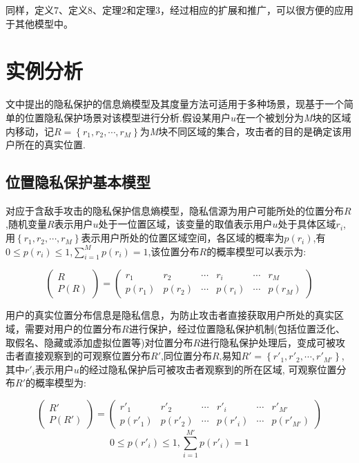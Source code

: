 同样，定义7、定义8、定理2和定理3，经过相应的扩展和推广，可以很方便的应用于其他模型中。

\section{实例分析}\label{instance analysis}
文中提出的隐私保护的信息熵模型及其度量方法可适用于多种场景，现基于一个简单的位置隐私保护场景对该模型进行分析.假设某用户$u$在一个被划分为\textit{M}块的区域内移动，记$R=\left \{ r_{1},r_{2},\cdots ,r_{M} \right \}$为\textit{M}块不同区域的集合，攻击者的目的是确定该用户所在的真实位置.
\subsection{位置隐私保护基本模型}
对应于含敌手攻击的隐私保护信息熵模型，隐私信源为用户可能所处的位置分布$R$,随机变量$R$表示用户$u$处于一位置区域，该变量的取值表示用户$u$处于具体区域$r_{i}$,用$\left \{ r_{1},r_{2},\cdots ,r_{M} \right \}$表示用户所处的位置区域空间，各区域的概率为$p(r_{i})$,有$0\leqslant p(r_{i})\leqslant 1$,$\sum_{i=1}^{M}p(r_{i})=1$,该位置分布$R$的概率模型可以表示为:

\begin{equation*}
\begin{pmatrix}
R\\ 
P(R)
\end{pmatrix}=\begin{pmatrix}
r_{1} & r_{2} & \cdots  & r_{i} & \cdots  & r_{M}\\ 
p(r_{1})& p(r_{2}) & \cdots & p(r_{i}) & \cdots & p(r_{M})
\end{pmatrix}
\end{equation*}

用户的真实位置分布信息是隐私信息，为防止攻击者直接获取用户所处的真实区域，需要对用户的位置分布$R$进行保护，经过位置隐私保护机制(包括位置泛化、取假名、隐藏或添加虚拟位置等)对位置分布$R$进行隐私保护处理后，变成可被攻击者直接观察到的可观察位置分布${R}'$,同位置分布$R$,易知${R}'=\left \{ {r}'_{1},{r}'_{2},\cdots ,{r}'_{{M}'} \right \}$,其中${r}'_{i}$表示用户$u$的经过隐私保护后可被攻击者观察到的所在区域, 可观察位置分布${R}'$的概率模型为:

\begin{equation*}
\begin{pmatrix}
R{}'\\ 
P({R}')
\end{pmatrix}=\begin{pmatrix}
{r}'_{1} & {r}'_{2} & \cdots  & {r}'_{i} & \cdots  & {r}'_{{M}'}\\ 
p({r}'_{1})& p({r}'_{2}) & \cdots & p({r}'_{i}) & \cdots & p({r}'_{{M}'})
\end{pmatrix}
\end{equation*}
\begin{equation*}
0\leq p({r}'_{i})\leq1,\sum_{i=1}^{M{}'}p({r}'_{i})=1
\end{equation*}


